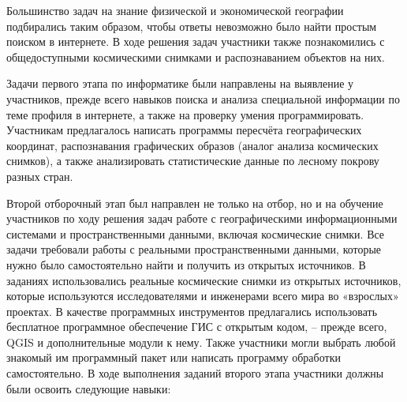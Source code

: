 Большинство задач на знание физической и экономической географии подбирались таким образом, чтобы ответы невозможно было найти простым поиском в интернете. В ходе решения задач участники также познакомились с общедоступными космическими снимками и распознаванием объектов на них.

Задачи первого этапа по информатике были направлены на выявление у участников, прежде всего навыков поиска и анализа специальной информации по теме профиля в интернете, а также на проверку умения программировать. Участникам предлагалось написать программы пересчёта географических координат, распознавания графических образов (аналог анализа космических снимков), а также анализировать статистические данные по лесному покрову разных стран.

Второй отборочный этап был направлен не только на отбор, но и на обучение участников  по ходу решения задач работе с географическими информационными системами и пространственными данными, включая космические снимки. Все задачи требовали работы с реальными пространственными данными, которые нужно было самостоятельно найти и получить из открытых источников. В заданиях использовались реальные космические снимки из открытых источников, которые используются исследователями и инженерами всего мира во «взрослых» проектах. В качестве программных инструментов предлагались использовать бесплатное программное обеспечение ГИС с открытым кодом, – прежде всего, QGIS и дополнительные модули к нему. Также участники могли выбрать любой знакомый им программный пакет или написать программу обработки самостоятельно. В ходе выполнения заданий второго этапа участники должны были освоить следующие навыки:
